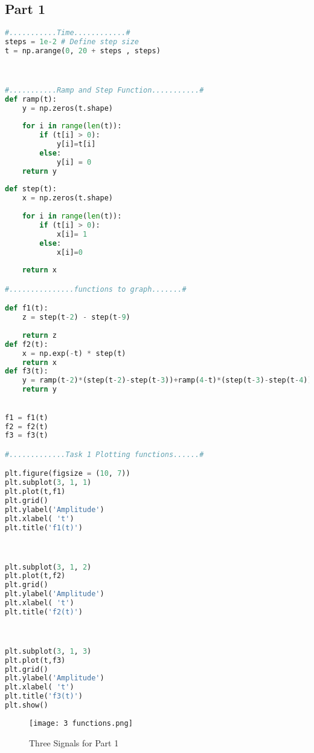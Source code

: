 \documentclass[11pt,a4]{report}
\begin{document}
\subsection{Part 1}
\begin{lstlisting}[language=Python]
#...........Time............#
steps = 1e-2 # Define step size
t = np.arange(0, 20 + steps , steps)



#...........Ramp and Step Function...........#
def ramp(t):
    y = np.zeros(t.shape)
    
    for i in range(len(t)):
        if (t[i] > 0):
            y[i]=t[i]
        else: 
            y[i] = 0
    return y
        
def step(t):
    x = np.zeros(t.shape)
    
    for i in range(len(t)):
        if (t[i] > 0):
            x[i]= 1
        else:
            x[i]=0
            
    return x

#...............functions to graph.......#

def f1(t):
    z = step(t-2) - step(t-9)
    
    return z
def f2(t):
    x = np.exp(-t) * step(t)
    return x
def f3(t):
    y = ramp(t-2)*(step(t-2)-step(t-3))+ramp(4-t)*(step(t-3)-step(t-4))
    return y

            
f1 = f1(t)
f2 = f2(t)
f3 = f3(t)

#.............Task 1 Plotting functions......#

plt.figure(figsize = (10, 7))
plt.subplot(3, 1, 1)
plt.plot(t,f1)
plt.grid()
plt.ylabel('Amplitude')
plt.xlabel( 't')
plt.title('f1(t)')



plt.subplot(3, 1, 2)
plt.plot(t,f2)
plt.grid()
plt.ylabel('Amplitude')
plt.xlabel( 't')
plt.title('f2(t)')



plt.subplot(3, 1, 3)
plt.plot(t,f3)
plt.grid()
plt.ylabel('Amplitude')
plt.xlabel( 't')
plt.title('f3(t)')
plt.show()
\end{lstlisting}

\begin{figure}[h!]
    \begin{center}
  \caption{Three Signals for Part 1}
  \texttt{[image: 3 functions.png]}
\end{center}
\end{figure}
\newpage
\end{document}

